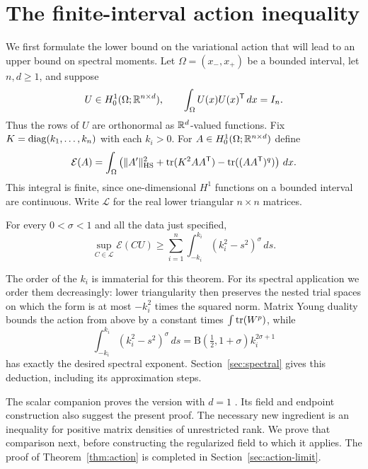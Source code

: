 \section{The finite-interval action inequality}\label{sec:action-framework}

We first formulate the lower bound on the variational action that will
lead to an upper bound on spectral moments. Let $\Omega=(x_-,x_+)$ be a bounded interval,
let $n,d\ge1$, and suppose
\begin{equation}\label{eq:row-orthonormality}
 U\in H^1_0(\Omega;\mathbb R^{n\times d}),\qquad
 \int_\Omega U(x)U(x)^{\mathsf T}\,dx=I_n.
\end{equation}
Thus the rows of $U$ are orthonormal as $\mathbb R^d$-valued functions. Fix
$K=\operatorname{diag}(k_1,\ldots,k_n)$ with each $k_i>0$. For
$A\in H^1_0(\Omega;\mathbb R^{n\times d})$ define
\begin{equation}\label{eq:action}
 \mathcal E(A)=\int_\Omega
 \left(\|A'\|_{\mathrm{HS}}^2+\operatorname{tr}(K^2AA^{\mathsf T})
                  -\operatorname{tr}((AA^{\mathsf T})^q)\right)\,dx.
\end{equation}
This integral is finite, since one-dimensional $H^1$ functions on a bounded
interval are continuous. Write $\mathcal L$ for the real lower triangular
$n\times n$ matrices.

\begin{theorem}\label{thm:action}
For every $0<\sigma<1$ and all the data just specified,
\begin{equation}\label{eq:action-bound}
 \sup_{C\in\mathcal L}\mathcal E(CU)
 \ge\sum_{i=1}^n\int_{-k_i}^{k_i}(k_i^2-s^2)^\sigma\,ds.
\end{equation}
\end{theorem}

The order of the $k_i$ is immaterial for this theorem. For its spectral
application we order them decreasingly: lower triangularity then preserves
the nested trial spaces on which the form is at most $-k_i^2$ times the
squared norm. Matrix Young duality bounds the action from above by a constant
times $\int\operatorname{tr}(W^p)$, while
\[
 \int_{-k_i}^{k_i}(k_i^2-s^2)^\sigma\,ds
 =\mathrm B(\tfrac12,1+\sigma)k_i^{2\sigma+1}
\]
has exactly the desired spectral exponent. Section~\ref{sec:spectral}
gives this deduction, including its approximation steps.

The scalar companion proves the version with $d=1$
\cite[Theorem~2.1]{ScalarCompanion}. Its field and endpoint construction
also suggest the present proof. The necessary new ingredient is an
inequality for positive matrix densities of unrestricted rank. We prove
that comparison next, before constructing the regularized field to which
it applies. The proof of Theorem~\ref{thm:action} is completed in
Section~\ref{sec:action-limit}.
